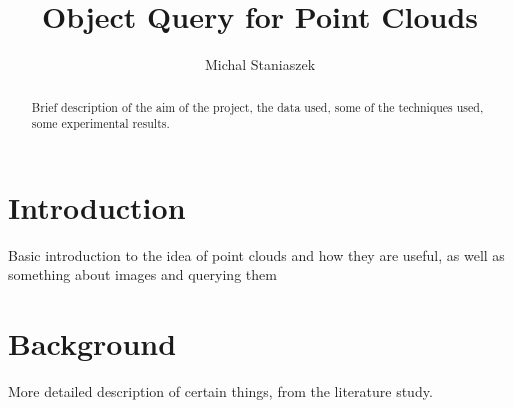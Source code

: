 \documentclass[11pt,a4paper]{report}
\author{Michal Staniaszek}
\title{Object Query for Point Clouds}
\begin{document}
\maketitle
\begin{abstract}
  Brief description of the aim of the project, the data used, some of the
  techniques used, some experimental results.
\end{abstract}
\tableofcontents
\chapter{Introduction}
Basic introduction to the idea of point clouds and how they are useful, as well
as something about images and querying them
\chapter{Background}
More detailed description of certain things, from the literature study.
\end{document}
